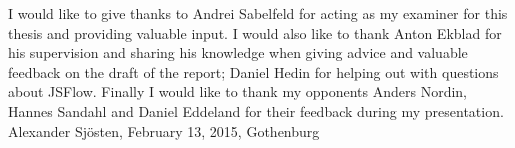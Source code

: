 \thispagestyle{empty}

\begin{acknowledgements}
I would like to give thanks to Andrei Sabelfeld for acting as my examiner for this thesis and providing valuable input. I would also like to thank Anton Ekblad for his supervision and sharing his knowledge when giving advice and valuable feedback on the draft of the report; Daniel Hedin for helping out with questions about JSFlow. Finally I would like to thank my opponents Anders Nordin, Hannes Sandahl and Daniel Eddeland for their feedback during my presentation. \\[1cm]

\hfill Alexander Sjösten, February 13, 2015, Gothenburg
\end{acknowledgements}
